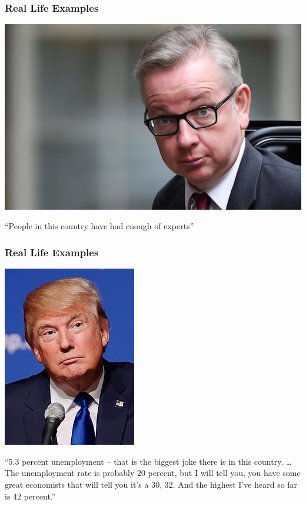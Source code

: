 \documentclass[handout]{beamer}
\begin{document}
\begin{frame}
	\frametitle{Real Life Examples}
	\begin{center}
		\includegraphics[scale=0.1]{./images/michael_gove.jpg}
	\end{center}
	\centering
	``People in this country have had enough of experts''
\end{frame}

\begin{frame}
	\frametitle{Real Life Examples}
	\begin{center}
		\includegraphics[scale=0.5]{./images/trump.jpg}
	\end{center}
	\centering
	``5.3 percent unemployment -- that is the biggest joke there is in this country. … The 				unemployment rate is probably 20 percent, but I will tell you, you have some great economists 		that will tell you it's a 30, 32. And the highest I've heard so far is 42 percent.''
\end{frame}
\end{document}
